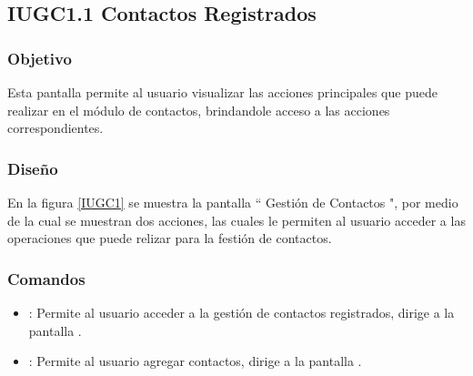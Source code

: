 \subsection{IUGC1.1 Contactos Registrados}

\subsubsection{Objetivo}

	
    Esta pantalla permite al usuario visualizar las acciones principales que puede realizar en el módulo de contactos, brindandole acceso a las acciones correspondientes.

\subsubsection{Diseño}


    En la figura \ref{IUGC1} se muestra la pantalla `` Gestión de Contactos ", por medio de la cual se muestran dos acciones, las cuales le permiten al usuario acceder a las operaciones que puede relizar para la festión de contactos.\\


\subsubsection{Comandos}
    \begin{itemize}
    	\item {}: Permite al usuario acceder a la gestión de contactos registrados, dirige a la pantalla .
        \item {}: Permite al usuario agregar contactos, dirige a la pantalla .
    \end{itemize}

